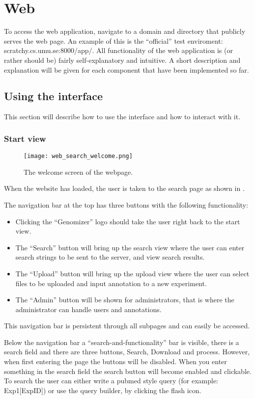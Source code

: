 \section{Web}
To access the web application, navigate to a domain and directory that publicly serves the web page. An example of this is the “official” test enviroment: scratchy.cs.umu.se:8000/app/.
All functionality of the web application is (or rather should be) fairly self-explanatory and intuitive. A short description and explanation will be given for each component that have been implemented so far.
\subsection{Using the interface}
This section will describe how to use the interface and how to interact with it.
\subsubsection{Start view}
\begin{figure}[h]
\centering
\texttt{[image: web\_search\_welcome.png]}
\caption{\label{fig:web_search_welcome} The welcome screen of the webpage.}
\end{figure}

When the website has loaded, the user is taken to the search page as shown in .

The navigation bar at the top has three buttons with the following functionality:
\begin{itemize}
	\item Clicking the “Genomizer” logo should take the user right back to the start view.
	\item The “Search” button will bring up the search view where the user can enter search strings to be sent to the server, and view search results.
	\item The “Upload” button will bring up the upload view where the user can select files to be uploaded and input annotation to a new experiment.
	\item The “Admin” button will be shown for administrators, that is where the administrator can handle users and annotations.
\end{itemize}
This navigation bar is persistent through all subpages and can easily be accessed.

Below the navigation bar a “search-and-functionality” bar is visible, there is a search field and there are three buttons, Search, Download and process. However, when first entering the page the buttons will be disabled. When you enter something in the search field the search button will become enabled and clickable. To search the user can either write a pubmed style query (for example: Exp1[ExpID]) or use the query builder, by clicking the flash icon.


